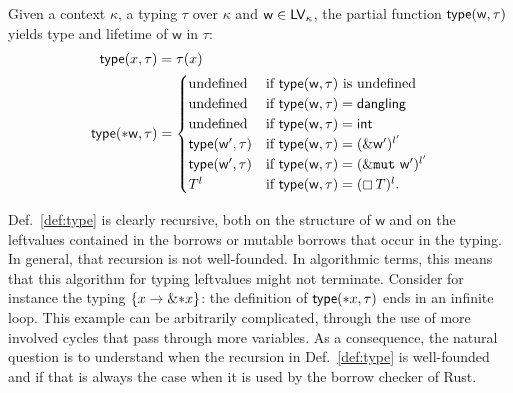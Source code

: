 \begin{definition}\label{def:type}
  Given a context $\kappa$, a typing $\tau$ over $\kappa$
  and $\mathsf{w}\in\mathsf{LV}_\kappa$, the partial function
  $\mathsf{type}(\mathsf{w},\tau)$ yields type and lifetime of $\mathsf{w}$ in $\tau$:
  \begin{align*}
    \mathsf{type}(x,\tau)&=\tau(x)\\
    \mathsf{type}(*\mathsf{w},\tau)&=\begin{cases}
    \text{undefined} & \text{if $\mathsf{type}(\mathsf{w},\tau)$ is undefined}\\
    \text{undefined} & \text{if $\mathsf{type}(\mathsf{w},\tau)=\mathsf{dangling}$}\\
    \text{undefined} & \text{if $\mathsf{type}(\mathsf{w},\tau)=\mathsf{int}$}\\
    \mathsf{type}(\mathsf{w}',\tau) & \text{if $\mathsf{type}(\mathsf{w},\tau)=(\&\mathsf{w}')^{l'}$}\\
    \mathsf{type}(\mathsf{w}',\tau) & \text{if $\mathsf{type}(\mathsf{w},\tau)=(\&\mathtt{mut}\ \mathsf{w}')^{l'}$}\\
    T^l & \text{if $\mathsf{type}(\mathsf{w},\tau)=(\boxempty\,{T})^l$.}
    \end{cases}
  \end{align*}
\end{definition}

Def.~\ref{def:type} is clearly recursive, both on the structure of $\mathsf{w}$ and
on the leftvalues contained in the borrows or mutable borrows that occur in the typing.
In general, that recursion is not well-founded. In algorithmic terms, this means
that this algorithm for typing leftvalues might not terminate.
Consider for instance the typing $\{x\to\&\mathtt{*}x\}$:
the definition of $\mathsf{type}(\mathtt{*}x,\tau)$ ends in an infinite loop.
This example can be arbitrarily complicated, through the
use of more involved cycles that pass through more variables. As a consequence,
the natural question is to understand when the recursion in
Def.~\ref{def:type} is well-founded and if that is always the case when it is
used by the borrow checker of Rust.
